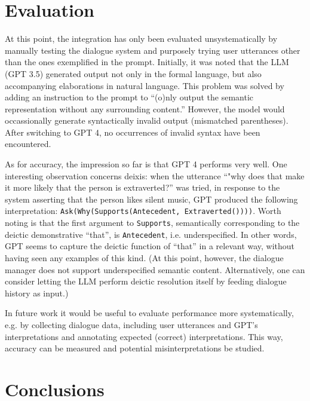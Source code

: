 \documentclass[11pt]{article}
\begin{document}
\section{Evaluation}
\label{sec:evaluation}
At this point, the integration has only been evaluated unsystematically by manually testing the dialogue system and purposely trying user utterances other than the ones exemplified in the prompt. Initially, it was noted that the LLM (GPT 3.5) generated output not only in the formal language, but also accompanying elaborations in natural language. This problem was solved by adding an instruction to the prompt to ``(o)nly output the semantic representation without any surrounding content.'' However, the model would occassionally generate syntactically invalid output (mismatched parentheses). After switching to GPT 4, no occurrences of invalid syntax have been encountered.

As for accuracy, the impression so far is that GPT 4 performs very well. One interesting observation concerns deixis: when the utterance ``"why does that make it more likely that the person is extraverted?'' was tried, in response to the system asserting that the person likes silent music, GPT produced the following interpretation: \texttt{Ask(Why(Supports(Antecedent, Extraverted())))}. Worth noting is that the first argument to \texttt{Supports}, semantically corresponding to the deictic demonstrative ``that'', is \texttt{Antecedent}, i.e. underspecified. In other words, GPT seems to capture the deictic function of ``that'' in a relevant way, without having seen any examples of this kind. (At this point, however, the dialogue manager does not support underspecified semantic content. Alternatively, one can consider letting the LLM perform deictic resolution itself by feeding dialogue history as input.)

In future work it would be useful to evaluate performance more systematically, e.g. by collecting dialogue data, including user utterances and GPT's interpretations and annotating expected (correct) interpretations. This way, accuracy can be measured and potential misinterpretations be studied.

\section{Conclusions}
\end{document}
